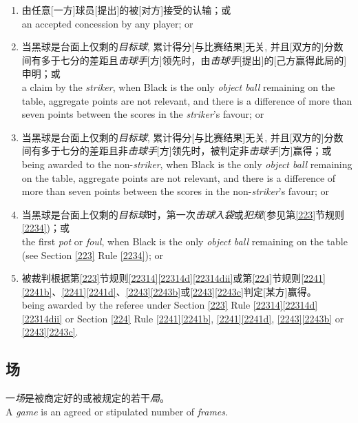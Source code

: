 \begin{enumerate}[label=(\alph*)]
    \item 由任意[一方]球员[提出]的被[对方]接受的认输；或\\
    an accepted concession by any player; or
    \item 当黑球是台面上仅剩的\textit{目标球}, 累计得分[与比赛结果]无关, 并且[双方的]分数间有多于七分的差距且\textit{击球手}[方]领先时，由\textit{击球手}[提出]的[己方赢得此局的]申明；或\\
    a claim by the \textit{striker}, when Black is the only \textit{object ball} remaining on the table, aggregate points are not relevant, and there is a difference of more than seven points between the scores in the \textit{striker}'s favour; or
    \item 当黑球是台面上仅剩的\textit{目标球}, 累计得分[与比赛结果]无关, 并且[双方的]分数间有多于七分的差距且非\textit{击球手}[方]领先时，被判定非\textit{击球手}[方]赢得；或\\
    being awarded to the non-\textit{striker}, when Black is the only \textit{object ball} remaining on the table, aggregate points are not relevant, and there is a difference of more than seven points between the scores in the non-\textit{striker}'s favour; or
    \item 当黑球是台面上仅剩的\textit{目标球}时，第一次\textit{击球入袋}或\textit{犯规}(参见第\ref{223}节规则\ref{2234})；或\\
    the first \textit{pot} or \textit{foul}, when Black is the only \textit{object ball} remaining on the table (see Section \ref{223} Rule \ref{2234}); or
    \item 被裁判根据第\ref{223}节规则\ref{22314}\ref{22314d}\ref{22314dii}或第\ref{224}节规则\ref{2241}\ref{2241b}、\ref{2241}\ref{2241d}、\ref{2243}\ref{2243b}或\ref{2243}\ref{2243c}判定[某方]赢得。\\
    being awarded by the referee under Section \ref{223} Rule \ref{22314}\ref{22314d} \ref{22314dii} or Section \ref{224} Rule \ref{2241}\ref{2241b}, \ref{2241}\ref{2241d}, \ref{2243}\ref{2243b} or \ref{2243}\ref{2243c}.
\end{enumerate}

\subsection{场}

\noindent 一\textit{场}是被商定好的或被规定的若干\textit{局}。\\
A \textit{game} is an agreed or stipulated number of \textit{frames}.


